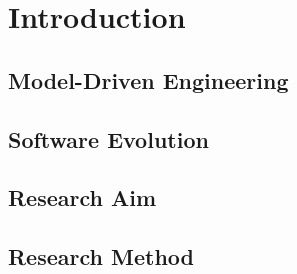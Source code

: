 
\chapter{Introduction}

\section{Model-Driven Engineering}

\section{Software Evolution}

\section{Research Aim}

\section{Research Method}
